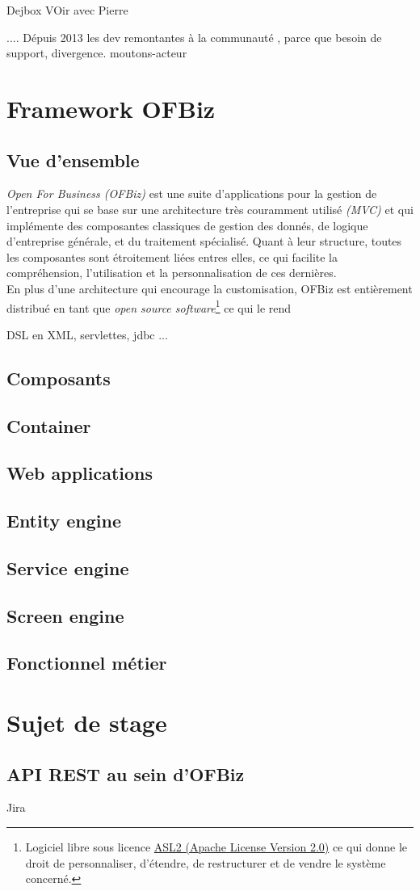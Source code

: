 Dejbox
VOir avec Pierre


....
Dépuis 2013 les dev remontantes à la communauté , parce que besoin de support,  divergence. moutons-acteur 






\newpage
\section{Framework OFBiz}
\subsection{Vue d'ensemble }
\emph{Open For Business (OFBiz)} est une suite d'applications pour la gestion de l'entreprise qui se base sur une architecture très couramment utilisé \emph{(MVC)} et qui implémente des composantes classiques de gestion des donnés, de logique d'entreprise générale, et du traitement spécialisé. Quant à leur structure, toutes les composantes sont étroitement liées entres elles, ce qui facilite la compréhension, l'utilisation et la personnalisation de ces dernières. 
\\
En plus d'une architecture qui encourage la customisation, OFBiz est entièrement distribué en tant que \emph{open source software}\footnote{Logiciel libre sous licence \href{https://www.apache.org/licenses/LICENSE-2.0.html}{ASL2 (Apache License Version 2.0)} ce qui donne le droit de personnaliser, d'étendre, de restructurer et de vendre le système concerné. } ce qui le rend 

DSL en XML, servlettes, jdbc ...
\subsection{Composants }

\subsection{Container}
\subsection{Web applications}
\subsection{Entity engine}
\subsection{Service engine}
\subsection{Screen engine}
\subsection{Fonctionnel métier}

\newpage
\section{Sujet de stage }



\subsection{API REST au sein d'OFBiz}

Jira
